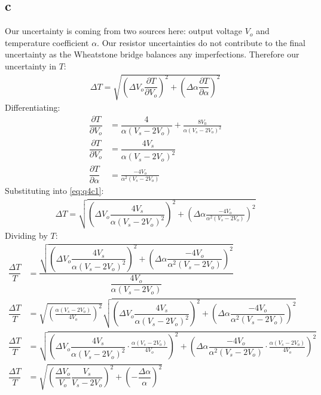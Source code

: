 \documentclass[11pt]{article}
\numberwithin{equation}{section}
\begin{document}
\subsection{c}
Our uncertainty is coming from two sources here: output voltage $V_o$ and temperature coefficient $\alpha$. Our resistor uncertainties do not contribute to the final uncertainty as the Wheatstone bridge balances any imperfections. Therefore our uncertainty in $T$:
\begin{align}
    \Delta T = \sqrt{\left(\Delta V_o \dfrac{\partial T}{\partial V_o}\right)^2 + \left(\Delta \alpha \dfrac{\partial T}{\partial \alpha}\right)^2} \label{eq:q4c1}
\end{align}
Differentiating:
\begin{align}
    \dfrac{\partial T}{\partial V_o} &= \dfrac{4}{\alpha\left(V_s - 2V_o\right)} + \frac{8V_0}{\alpha\left(V_s -2V_o\right)^2}\\
    \dfrac{\partial T}{\partial V_o} &= \dfrac{4V_s}{\alpha\left(V_s - 2V_o\right)^2}\\
    \dfrac{\partial T}{\partial \alpha} &= \frac{-4V_o}{\alpha^2\left(V_s - 2V_o\right)}
\end{align}
Substituting into \ref{eq:q4c1}:
\begin{align}
    \Delta T = \sqrt{\left(\Delta V_o \dfrac{4V_s}{\alpha\left(V_s - 2V_o\right)^2}\right)^2 + \left(\Delta \alpha \frac{-4V_o}{\alpha^2\left(V_s - 2V_o\right)}\right)^2}  
\end{align}
Dividing by $T$:
\begin{align}
    \dfrac{\Delta T}{T} &= \dfrac{\sqrt{\left(\Delta V_o \dfrac{4V_s}{\alpha\left(V_s - 2V_o\right)^2}\right)^2 + \left(\Delta \alpha \dfrac{-4V_o}{\alpha^2\left(V_s - 2V_o\right)}\right)^2}}{\dfrac{4V_o}{\alpha\left(V_s - 2V_o\right)}}\\
    \dfrac{\Delta T}{T} &= \sqrt{\left(\frac{\alpha\left(V_s - 2V_o\right)}{4V_o}\right)^2} \sqrt{\left(\Delta V_o \dfrac{4V_s}{\alpha\left(V_s - 2V_o\right)^2}\right)^2 + \left(\Delta \alpha \dfrac{-4V_o}{\alpha^2\left(V_s - 2V_o\right)}\right)^2}\\
    \dfrac{\Delta T}{T} &= \sqrt{\left(\Delta V_o \dfrac{4V_s}{\alpha\left(V_s - 2V_o\right)^2}\cdot\frac{\alpha\left(V_s - 2V_o\right)}{4V_o}\right)^2 + \left(\Delta \alpha \dfrac{-4V_o}{\alpha^2\left(V_s - 2V_o\right)}\cdot\frac{\alpha\left(V_s - 2V_o\right)}{4V_o}\right)^2}\\
    \dfrac{\Delta T}{T} &= \sqrt{\left(\dfrac{\Delta V_o}{V_o}\dfrac{V_s}{V_s - 2V_o}\right)^2 + \left(-\dfrac{\Delta \alpha}{\alpha}\right)^2} \label{eq:q4c2}
\end{align}
\end{document}
